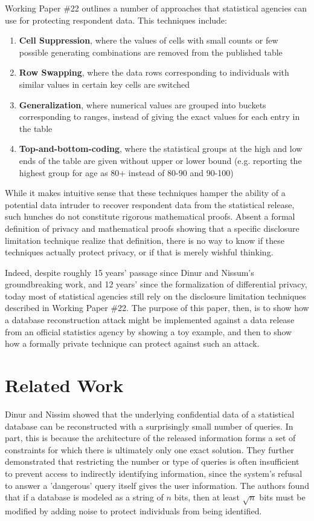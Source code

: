 \documentclass[runningheads]{llncs}
\begin{document}
Working Paper \#22 outlines a number of approaches that statistical
agencies can use for protecting respondent data. This techniques include:
\begin{enumerate}
  \item \textbf{Cell Suppression}, where the values of cells with small counts or few possible
        generating combinations are removed from the published table
  \item \textbf{Row Swapping}, where the data rows corresponding to individuals
        with similar values in certain key cells are switched
  \item \textbf{Generalization}, where numerical values are grouped into
        buckets corresponding to ranges, instead of giving the exact
        values for each entry in the table
  \item \textbf{Top-and-bottom-coding}, where the statistical groups at the high and low ends
        of the table are given without upper or lower bound (e.g.
        reporting the highest group for age as 80+ instead of
        80-90 and 90-100)
\end{enumerate}

While it makes intuitive sense that these techniques hamper the
ability of a potential data intruder\cite{data-intruder} to recover respondent data from the
statistical release, such hunches do not constitute rigorous
mathematical proofs. Absent a formal definition of privacy and
mathematical proofs showing that a specific disclosure limitation
technique realize that definition, there is no way to know if these
techniques actually protect privacy, or if that is merely wishful thinking.

Indeed, despite roughly 15 years' passage since Dinur and Nissum's
groundbreaking work\cite{noise}, and 12 years' since the formalization
of differential privacy\cite{Dwork:2006:CNS:2180286.2180305}, today most of
statistical agencies still rely on the disclosure
limitation techniques described in Working Paper \#22. The purpose of
this paper, then, is to show how a database reconstruction attack
might be implemented against a data release from an official
statistics agency by showing a toy example, and then to show how a
formally private  technique can protect against such an attack.

\section{Related Work}

Dinur and Nissim\cite{noise} showed that the underlying
confidential data of a statistical database can be reconstructed with
a surprisingly small number of queries. In part, this is because the
architecture of the released information forms a set of constraints
for which there is ultimately only one exact solution. They further
demonstrated that restricting the number or type of queries is often
insufficient to prevent access to indirectly identifying information,
since the system's refusal to answer a 'dangerous' query itself gives
the user information. The authors found that if a database is modeled
as a string of $n$ bits, then at least $\sqrt{n}$ bits must be
modified by adding noise to protect individuals from being identified. 
\end{document}
